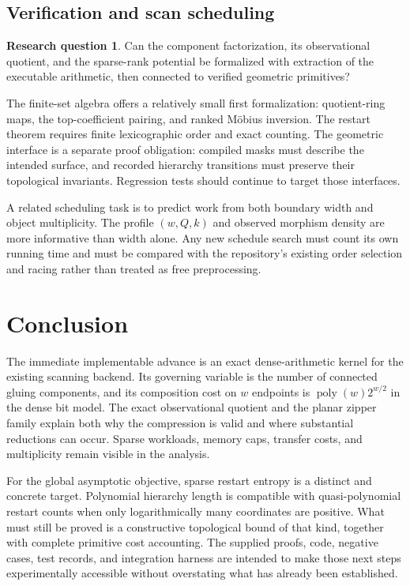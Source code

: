 \documentclass[11pt,letterpaper]{article}
\theoremstyle{definition}
\newtheorem{question}[theorem]{Research question}
\theoremstyle{remark}
\newcommand{\poly}{\operatorname{poly}}
\begin{document}
\subsection{Verification and scan scheduling}
\begin{question}
Can the component factorization, its observational quotient, and the
sparse-rank potential be formalized with extraction of the executable
arithmetic, then connected to verified geometric primitives?
\end{question}
The finite-set algebra offers a relatively small first formalization:
quotient-ring maps, the top-coefficient pairing, and ranked M\"obius
inversion. The restart theorem requires finite lexicographic order and
exact counting. The geometric interface is a separate proof obligation:
compiled masks must describe the intended surface, and recorded hierarchy
transitions must preserve their topological invariants. Regression tests
should continue to target those interfaces.

A related scheduling task is to predict work from both boundary width and
object multiplicity. The profile $(w,Q,k)$ and observed morphism density
are more informative than width alone. Any new schedule search must count
its own running time and must be compared with the repository's existing
order selection and racing rather than treated as free preprocessing.

\section{Conclusion}
The immediate implementable advance is an exact dense-arithmetic kernel
for the existing scanning backend. Its governing variable is the number
of connected gluing components, and its composition cost on $w$ endpoints
is $\poly(w)2^{w/2}$ in the dense bit model. The exact observational quotient
and the planar zipper family explain both why the compression is valid and
where substantial reductions can occur. Sparse workloads, memory caps,
transfer costs, and multiplicity remain visible in the analysis.

For the global asymptotic objective, sparse restart entropy is a distinct
and concrete target. Polynomial hierarchy length is compatible with
quasi-polynomial restart counts when only logarithmically many coordinates
are positive. What must still be proved is a constructive topological
bound of that kind, together with complete primitive cost accounting.
The supplied proofs, code, negative cases, test records, and integration
harness are intended to make those next steps experimentally accessible
without overstating what has already been established.
\end{document}
